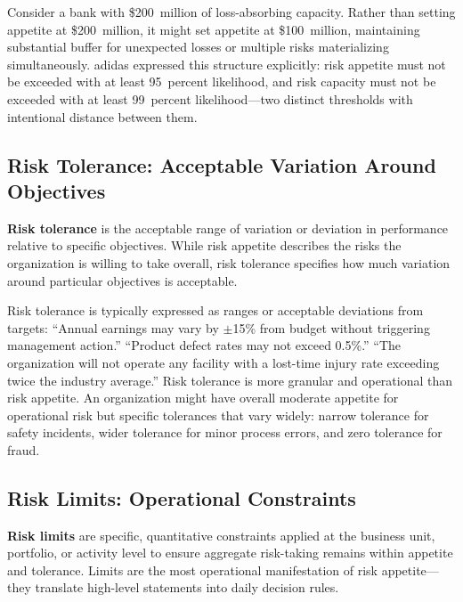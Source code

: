 \documentclass[11pt,openany]{book}
\begin{document}
Consider a bank with \$200~million of loss-absorbing capacity. Rather than
setting appetite at \$200~million, it might set appetite at \$100~million,
maintaining substantial buffer for unexpected losses or multiple risks
materializing simultaneously. adidas expressed this structure explicitly: risk
appetite must not be exceeded with at least 95~percent likelihood, and risk
capacity must not be exceeded with at least 99~percent likelihood---two distinct
thresholds with intentional distance between them.

\subsection{Risk Tolerance: Acceptable Variation Around Objectives}
\label{subsec:risk-tolerance}

\textbf{Risk tolerance} is the acceptable range of variation or deviation in
performance relative to specific objectives. While risk appetite describes the
risks the organization is willing to take overall, risk tolerance specifies how
much variation around particular objectives is acceptable.

Risk tolerance is typically expressed as ranges or acceptable deviations from
targets: ``Annual earnings may vary by $\pm$15\% from budget without triggering
management action.'' ``Product defect rates may not exceed 0.5\%.'' ``The
organization will not operate any facility with a lost-time injury rate
exceeding twice the industry average.'' Risk tolerance is more granular and
operational than risk appetite. An organization might have overall moderate
appetite for operational risk but specific tolerances that vary widely: narrow
tolerance for safety incidents, wider tolerance for minor process errors, and
zero tolerance for fraud.

\subsection{Risk Limits: Operational Constraints}
\label{subsec:risk-limits}

\textbf{Risk limits} are specific, quantitative constraints applied at the
business unit, portfolio, or activity level to ensure aggregate risk-taking
remains within appetite and tolerance. Limits are the most operational
manifestation of risk appetite---they translate high-level statements into daily
decision rules.
\end{document}
